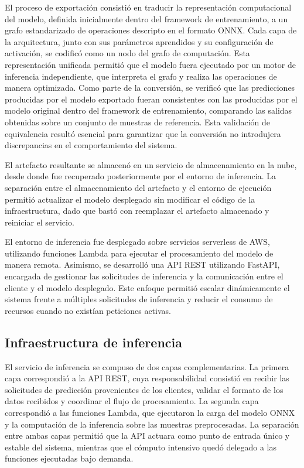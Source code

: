 El proceso de exportación consistió en traducir la representación computacional del modelo, definida inicialmente dentro del framework de entrenamiento, a un grafo estandarizado de operaciones descripto en el formato ONNX. Cada capa de la arquitectura, junto con sus parámetros aprendidos y su configuración de activación, se codificó como un nodo del grafo de computación. Esta representación unificada permitió que el modelo fuera ejecutado por un motor de inferencia independiente, que interpreta el grafo y realiza las operaciones de manera optimizada. Como parte de la conversión, se verificó que las predicciones producidas por el modelo exportado fueran consistentes con las producidas por el modelo original dentro del framework de entrenamiento, comparando las salidas obtenidas sobre un conjunto de muestras de referencia. Esta validación de equivalencia resultó esencial para garantizar que la conversión no introdujera discrepancias en el comportamiento del sistema.

El artefacto resultante se almacenó en un servicio de almacenamiento en la nube, desde donde fue recuperado posteriormente por el entorno de inferencia. La separación entre el almacenamiento del artefacto y el entorno de ejecución permitió actualizar el modelo desplegado sin modificar el código de la infraestructura, dado que bastó con reemplazar el artefacto almacenado y reiniciar el servicio.

El entorno de inferencia fue desplegado sobre servicios serverless de AWS, utilizando funciones Lambda para ejecutar el procesamiento del modelo de manera remota. Asimismo, se desarrolló una API REST utilizando FastAPI, encargada de gestionar las solicitudes de inferencia y la comunicación entre el cliente y el modelo desplegado. Este enfoque permitió escalar dinámicamente el sistema frente a múltiples solicitudes de inferencia y reducir el consumo de recursos cuando no existían peticiones activas.

\subsection{Infraestructura de inferencia}

El servicio de inferencia se compuso de dos capas complementarias. La primera capa correspondió a la API REST, cuya responsabilidad consistió en recibir las solicitudes de predicción provenientes de los clientes, validar el formato de los datos recibidos y coordinar el flujo de procesamiento. La segunda capa correspondió a las funciones Lambda, que ejecutaron la carga del modelo ONNX y la computación de la inferencia sobre las muestras preprocesadas. La separación entre ambas capas permitió que la API actuara como punto de entrada único y estable del sistema, mientras que el cómputo intensivo quedó delegado a las funciones ejecutadas bajo demanda.

